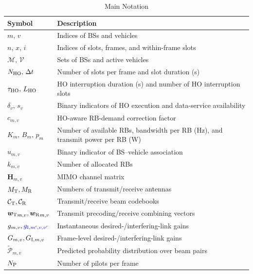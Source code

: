 \documentclass[10pt,journal,letterpaper]{journal_template/IEEEtran}
\newcommand{\rev}[1]{\textcolor{revisioncolor}{{}#1}}
\theoremstyle{remark}
\begin{document}
\begin{table}[t]
    \centering
    \color{revisioncolor}
    \caption{Main Notation}
    \label{tab:notation}
    \small
    \begin{tabular}{@{}>{\raggedright\arraybackslash}p{}>{\raggedright\arraybackslash}p{}@{}}
        \toprule
        \textbf{Symbol} & \textbf{Description} \\
        \midrule
        $m,\,v$ & Indices of BSs and vehicles \\
        $n,\,x,\,i$ & Indices of slots, frames, and within-frame slots \\
        $\mathcal{M},\,\mathcal{V}$ & Sets of BSs and active vehicles \\
        $N_{\rm HO},\,\Delta t$ & Number of slots per frame and slot duration (s) \\
        \rev{$\tau_{\rm HO},\,L_{\rm HO}$} & \rev{HO interruption duration (s) and number of HO interruption slots} \\
        \rev{$\delta_v,\,s_v$} & \rev{Binary indicators of HO execution and data-service availability} \\
        \rev{$c_{m,v}$} & \rev{HO-aware RB-demand correction factor} \\
        $K_m,\,B_m,\,p_m$ & Number of available RBs, bandwidth per RB (Hz), and transmit power per RB (W) \\
        $u_{m,v}$ & Binary indicator of BS--vehicle association \\
        $k_{m,v}$ & Number of allocated RBs\\
        $\boldsymbol{H}_{m,v}$ & MIMO channel matrix \\
        $M_{\rm T} , M_{\rm R}$ & Numbers of transmit/receive antennas \\
        $\mathcal{C}_{\rm T} , \mathcal{C}_{\rm R}$ & Transmit/receive beam codebooks \\
        $ {\bm{w}_{\rm T}}_{m,v} , {\bm{w}_{\rm R}}_{m,v}$ & Transmit precoding/receive combining vectors \\
        $g_{m,v} , \rev{g_{{\rm I},m',v,v'}}$ & Instantaneous desired-/interfering-link gains \\
        $G_{m,v} , G_{{\rm I},m,v}$ & Frame-level desired-/interfering-link gains \\
        $\tilde{\mathcal P}_{m,v}$ & Predicted probability distribution over beam pairs \\
        $N_{\rm P}$ & Number of pilots per frame\\

\end{tabular}
\end{table}
\end{document}

